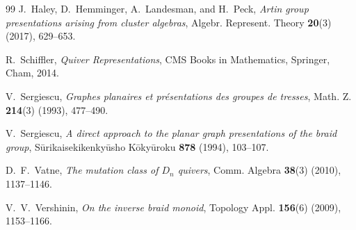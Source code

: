 \documentclass[a4paper, 12pt, reqno]{amsart}
\theoremstyle{definition}
\begin{document}
\begin{thebibliography}{99}
J.~Haley, D.~Hemminger, A.~Landesman, and H.~Peck,
\emph{Artin group presentations arising from cluster algebras},
Algebr. Represent. Theory \textbf{20}(3) (2017), 629--653.


R.~Schiffler, \emph{Quiver Representations}, CMS Books in Mathematics, Springer, Cham, 2014.


V.~Sergiescu,
\emph{Graphes planaires et pr\'esentations des groupes de tresses},
Math. Z. \textbf{214}(3) (1993), 477--490.

V.~Sergiescu,
\emph{A direct approach to the planar graph presentations
of the braid group},
S\=urikaisekikenky\=usho K\=oky\=uroku
\textbf{878} (1994), 103--107.

D.~F.~Vatne, \emph{The mutation class of $D_n$ quivers},
Comm. Algebra \textbf{38}(3) (2010), 1137--1146.

V.~V.~Vershinin, \emph{On the inverse braid monoid},
Topology Appl. \textbf{156}(6) (2009), 1153--1166.

\end{thebibliography}
\end{document}
